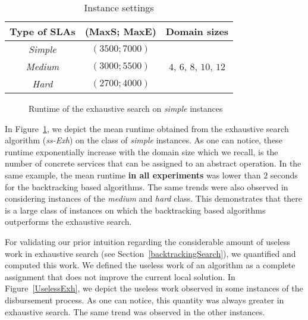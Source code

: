 \documentclass[a4paper]{article}
\begin{document}
\begin{table}[htbp]
\centering 
\begin{tabular}{c|c|c}
\hline
{\bf Type of SLAs }  & {\bf (MaxS; MaxE)} & {\bf Domain sizes}  \\\hline
  \textit{Simple}   & {$(3500; 7000)$}   & \multirow{3}{*}{$4$, $6$, $8$, $10$, $12$} \\
  \textit{Medium}   & {$(3000; 5500)$}   \\
  \textit{Hard}   & {$(2700; 4000)$}   \\\hline
\end{tabular}
\caption{Instance settings}
\label{instanceSetting}
\end{table}


\begin{figure}[ht]
\centering
{}


\caption{Runtime of the exhaustive search on {\it simple} instances}
\label{Time-ss-Exh}
\end{figure}


In Figure~\ref{Time-ss-Exh}, we depict the mean runtime obtained from the exhaustive 
search algorithm ({\it ss-Exh}) on the class of {\it simple} instances. As one can notice, these 
runtime exponentially increase with the domain size which we recall, is the number of concrete 
services that can be assigned to an abstract operation. In the same example, the mean runtime {\bf in all experiments }
was lower than $2$ seconds for the backtracking based algorithms. The same trends were also observed in 
considering instances of the {\it medium} and {\it hard} class. This demonstrates that there is 
a large class of instances on which the backtracking based algorithms outperforms the exhaustive search. 

For validating our prior intuition regarding the considerable amount of useless work in exhaustive 
search (see Section~\ref{backtrackingSearch}), we quantified and computed this work. We defined the 
useless work of an algorithm as a complete assignment that does not improve the current 
local solution. In Figure~\ref{UselessExh}, we depict the useless work observed in some instances of the 
disbursement process. As one can notice, this quantity was always greater in exhaustive search. The 
same trend was observed in the other instances. 
\end{document}
